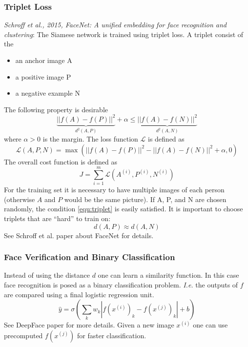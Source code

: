 \documentclass{article}
\begin{document}
\subsubsection{Triplet Loss}
\emph{Schroff et al., 2015, FaceNet: A unified embedding for face recognition and clustering}:
The Siamese network is trained using triplet loss.
A triplet consist of the
\begin{itemize}
  \item an anchor image A
  \item a positive image P
  \item a negative example N
\end{itemize}
The following property is desirable
\begin{equation}\label{equ:triplet}
  \underbrace{||f(A)-f(P)||^2}_{d^2(A,P)} + \alpha \le \underbrace{||f(A)-f(N)||^2}_{d^2(A,N)}
\end{equation}
where $\alpha>0$ is the margin.
The loss function $\mathcal{L}$ is defined as
\begin{equation}
  \mathcal{L}(A,P,N)=\max(||f(A)-f(P)||^2-||f(A)-f(N)||^2+\alpha, 0)
\end{equation}
The overall cost function is defined as
\begin{equation}
  J=\sum_{i=1}^m\mathcal{L}(A^{(i)},P^{(i)},N^{(i)})
\end{equation}
For the training set it is necessary to have multiple images of each person (otherwise $A$ and $P$ would be the same picture).
If A, P, and N are chosen randomly, the condition \cref{equ:triplet} is easily satisfied.
It is important to choose triplets that are ``hard'' to train on:
\begin{equation}
  d(A, P)\approx d(A, N)
\end{equation}
See Schroff et al. paper about FaceNet for details.

\subsubsection{Face Verification and Binary Classification}
Instead of using the distance $d$ one can learn a similarity function.
In this case face recognition is posed as a binary classification problem.
\emph{I.e.} the outputs of $f$ are compared using a final logistic regression unit.
\begin{equation}
  \hat{y}=\sigma(\sum_kw_k|f(x^{(i)})_k-f(x^{(j)})_k|+b)
\end{equation}
See DeepFace paper for more details.
Given a new image $x^{(i)}$ one can use precomputed $f(x^{(j)})$ for faster classification.
\end{document}
